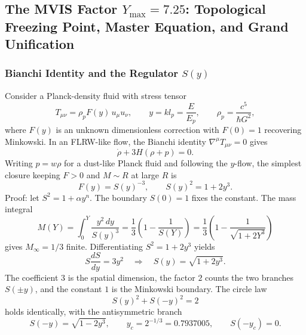 \documentclass[12pt,oneside,openany]{book}
\begin{document}
\subsection{The MVIS Factor \(Y_{\max} = 7.25\): Topological Freezing Point, Master Equation, and Grand Unification}
\label{sub:mvis_unification}

\subsubsection{Bianchi Identity and the Regulator \(S(y)\)}
\label{sssec:bianchi_regulator}

Consider a Planck-density fluid with stress tensor
\begin{equation}
T_{\mu\nu} = \rho_p F(y)\, u_\mu u_\nu, \qquad y = k l_p = \frac{E}{E_p}, \qquad \rho_p = \frac{c^5}{\hbar G^2},
\label{eq:stress_tensor}
\end{equation}
where \(F(y)\) is an unknown dimensionless correction with \(F(0) = 1\) recovering Minkowski. In an FLRW-like flow, the Bianchi identity \(\nabla^\mu T_{\mu\nu} = 0\) gives
\begin{equation}
\dot\rho + 3H(\rho + p) = 0.
\end{equation}
Writing \(p = w\rho\) for a dust-like Planck fluid and following the \(y\)-flow, the simplest closure keeping \(F > 0\) and \(M \sim R\) at large \(R\) is
\begin{equation}
F(y) = S(y)^{-3}, \qquad S(y)^2 = 1 + 2y^3.
\label{eq:regulator}
\end{equation}
Proof: let \(S^2 = 1 + \alpha y^n\). The boundary \(S(0) = 1\) fixes the constant. The mass integral
\begin{equation}
M(Y) = \int_0^Y \frac{y^2\,dy}{S(y)^3} = \frac{1}{3}\left(1 - \frac{1}{S(Y)}\right) = \frac{1}{3}\left(1 - \frac{1}{\sqrt{1+2Y^3}}\right)
\label{eq:mass_integral}
\end{equation}
gives \(M_\infty = 1/3\) finite. Differentiating \(S^2 = 1 + 2y^3\) yields
\begin{equation}
\boxed{S\frac{dS}{dy} = 3y^2 \quad \Longrightarrow \quad S(y) = \sqrt{1+2y^3}.}
\label{eq:bianchi_solution}
\end{equation}
The coefficient \(3\) is the spatial dimension, the factor \(2\) counts the two branches \(S(\pm y)\), and the constant \(1\) is the Minkowski boundary. The circle law
\begin{equation}
S(y)^2 + S(-y)^2 = 2
\label{eq:circle_law}
\end{equation}
holds identically, with the antisymmetric branch
\begin{equation}
S(-y) = \sqrt{1-2y^3}, \qquad y_c = 2^{-1/3} = 0.7937005, \qquad S(-y_c) = 0.
\end{equation}
\end{document}
